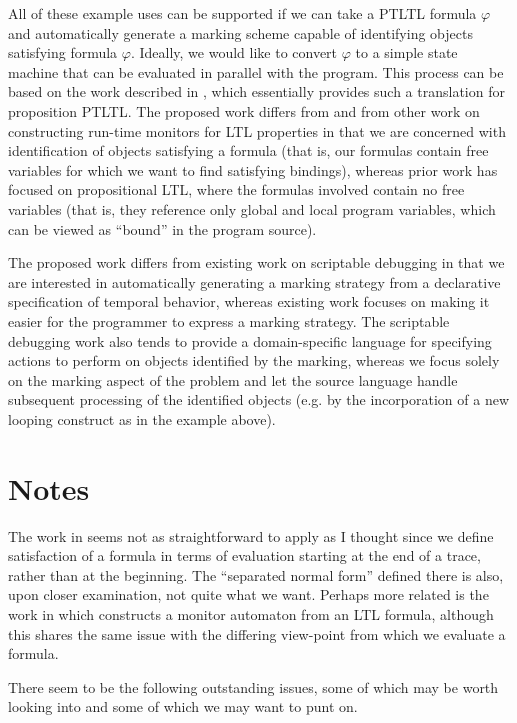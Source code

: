 \documentclass{article}
\newcommand{\ltlform}{\varphi}
\begin{document}
All of these example uses can be supported if we can take a PTLTL formula $\ltlform$ and automatically generate a marking scheme capable of identifying objects satisfying formula $\ltlform$.  Ideally, we would like to convert $\ltlform$ to a simple state machine that can be evaluated in parallel with the program.  This process can be based on the work described in \cite{bounded-verif-ltl}, which essentially provides such a translation for proposition PTLTL.  The proposed work differs from \cite{bounded-verif-ltl} and from other work on constructing run-time monitors for LTL properties in that we are concerned with identification of objects satisfying a formula (that is, our formulas contain free variables for which we want to find satisfying bindings), whereas prior work has focused on propositional LTL, where the formulas involved contain no free variables (that is, they reference only global and local program variables, which can be viewed as ``bound'' in the program source).

The proposed work differs from existing work on scriptable debugging in that we are interested in automatically generating a marking strategy from a declarative specification of temporal behavior, whereas existing work focuses on making it easier for the programmer to express a marking strategy.  The scriptable debugging work also tends to provide a domain-specific language for specifying actions to perform on objects identified by the marking, whereas we focus solely on the marking aspect of the problem and let the source language handle subsequent processing of the identified objects (e.g. by the incorporation of a new looping construct as in the example above).

\section{Notes}

The work in \cite{bounded-verif-ltl} seems not as straightforward to apply as I thought since we define satisfaction of a formula in terms of evaluation starting at the end of a trace, rather than at the beginning.  The ``separated normal form'' defined there is also, upon closer examination, not quite what we want.  Perhaps more related is the work in \cite{runtime-verif-LTL} which constructs a monitor automaton from an LTL formula, although this shares the same issue with the differing view-point from which we evaluate a formula.

There seem to be the following outstanding issues, some of which may be worth looking into and some of which we may want to punt on.
\end{document}
